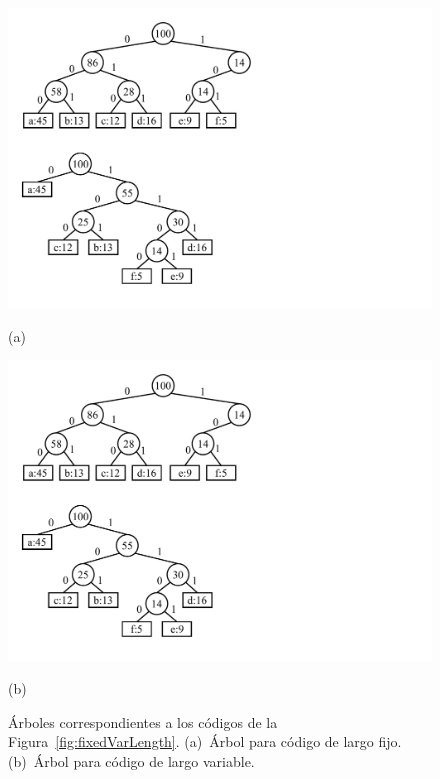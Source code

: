 \begin{figure}[b]
    	\centering
    	\begin{minipage}{0.45\textwidth}
    		\centering
    		\includegraphics[scale=.45, clip,  trim=20 350 350 20]{img/graphs-fixVarTrees.pdf}
    		
    		(a)
    	\end{minipage}
    	\begin{minipage}{0.45\textwidth}
    		\centering
    		\includegraphics[scale=.45, clip, trim=20 40 430 280 ]{img/graphs-fixVarTrees.pdf}
    		
    		(b)
    	\end{minipage}

    \caption{Árboles correspondientes a los códigos de la Figura~\ref{fig:fixedVarLength}. (a)~Árbol para código de largo fijo. (b)~Árbol para código de largo variable.}
    \label{fig:fixVarTrees}
\end{figure}
